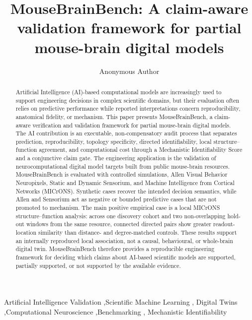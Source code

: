 \documentclass[a4paper,fleqn]{cas-sc}
\begin{document}
\let\WriteBookmarks\relax
\def\floatpagepagefraction{1}
\def\textpagefraction{.001}



\title[mode=title]{MouseBrainBench: A claim-aware validation framework for partial
mouse-brain digital models}


\author[1]{Anonymous Author}


\begin{abstract}
Artificial Intelligence (AI)-based computational models are increasingly used to support engineering decisions in complex scientific domains, but their evaluation often relies on predictive performance while reported interpretations concern reproducibility, anatomical fidelity, or mechanism. This paper presents MouseBrainBench, a claim-aware verification and validation framework for partial mouse-brain digital models. The AI contribution is an executable, non-compensatory audit process that separates prediction, reproducibility, topology specificity, directed identifiability, local structure--function agreement, and computational cost through a Mechanistic Identifiability Score and a conjunctive claim gate. The engineering application is the validation of neurocomputational digital model targets built from public mouse-brain resources. MouseBrainBench is evaluated with controlled simulations, Allen Visual Behavior Neuropixels, Static and Dynamic Sensorium, and Machine Intelligence from Cortical Networks (MICrONS). Synthetic cases recover the intended decision semantics, while Allen and Sensorium act as negative or bounded predictive cases that are not promoted to mechanism. The main positive empirical case is a local MICrONS structure--function analysis: across one discovery cohort and two non-overlapping hold-out windows from the same resource, connected directed pairs show greater readout-location similarity than distance- and degree-matched controls. These results support an internally reproduced local association, not a causal, behavioural, or whole-brain digital twin. MouseBrainBench therefore provides a reproducible engineering framework for deciding which claims about AI-based scientific models are supported, partially supported, or not supported by the available evidence.
\end{abstract}


\begin{keywords}
Artificial Intelligence Validation \sep Scientific Machine Learning \sep
Digital Twins \sep Computational Neuroscience \sep Benchmarking \sep
Mechanistic Identifiability
\end{keywords}
\end{document}

